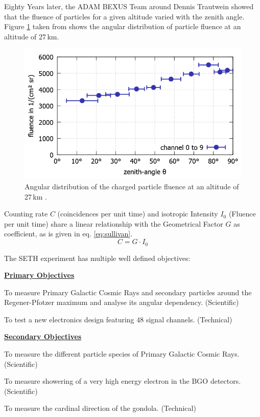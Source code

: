 Eighty Years later, the \ac{ADAM} \ac{BEXUS} Team around Dennis Trautwein showed that the fluence of particles for a given altitude varied with the zenith angle. Figure \ref{fig:martensen2015} taken from \parencite{martensen2015} shows the angular distribution of particle fluence at an altitude of 27\,km.

\begin{figure}[H]
    \centering
    \includegraphics[width=0.6\linewidth]{images/01_background/martensen.png}
    \caption[Results of \acs{ADAM} at 27\,km]{Angular distribution of the charged particle fluence at an altitude of 27\,km \parencite{martensen2015}.}
    \label{fig:martensen2015}
\end{figure}

Counting rate $C$ (coincidences per unit time) and isotropic Intensity $I_0$ (Fluence per unit time) share a linear relationship with the Geometrical Factor $G$ as coefficient, as is given in eq. \eqref{eq:sullivan}\parencite{SULLIVAN19715}.
\begin{equation}
    C=G\cdot I_0
    \label{eq:sullivan}
\end{equation}

\newpage
The \ac{SETH} experiment has multiple well defined objectives:

    \underline{\textbf{Primary Objectives}}
		\begin{description}\setlength\itemsep{-1em}
			\item[Obj. 1.1:] To measure Primary Galactic Cosmic Rays and secondary particles around the Regener-Pfotzer maximum and analyse its angular dependency. (Scientific)
			\item[Obj. 1.2:] To test a new electronics design featuring 48 signal channels. (Technical)
		\end{description}
	\underline{\textbf{Secondary Objectives}}
		\begin{description}\setlength\itemsep{-1em}
			\item[Obj. 2.1:] To measure the different particle species of Primary Galactic Cosmic Rays. (Scientific)
            \item[Obj. 2.2:] To measure showering of a very high energy electron in the \ac{BGO} detectors. (Scientific)
            \item[Obj. 2.3:] To measure the cardinal direction of the gondola. (Technical)
		\end{description}

